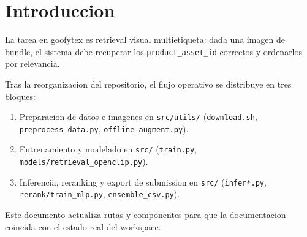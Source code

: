 \section{Introduccion}

La tarea en goofytex es retrieval visual multietiqueta: dada una imagen de bundle, el sistema debe recuperar los \texttt{product\_asset\_id} correctos y ordenarlos por relevancia.

Tras la reorganizacion del repositorio, el flujo operativo se distribuye en tres bloques:
\begin{enumerate}
  \item Preparacion de datos e imagenes en \texttt{src/utils/} (\texttt{download.sh}, \texttt{preprocess\_data.py}, \texttt{offline\_augment.py}).
  \item Entrenamiento y modelado en \texttt{src/} (\texttt{train.py}, \texttt{models/retrieval\_openclip.py}).
  \item Inferencia, reranking y export de submission en \texttt{src/} (\texttt{infer*.py}, \texttt{rerank/train\_mlp.py}, \texttt{ensemble\_csv.py}).
\end{enumerate}

Este documento actualiza rutas y componentes para que la documentacion coincida con el estado real del workspace.
